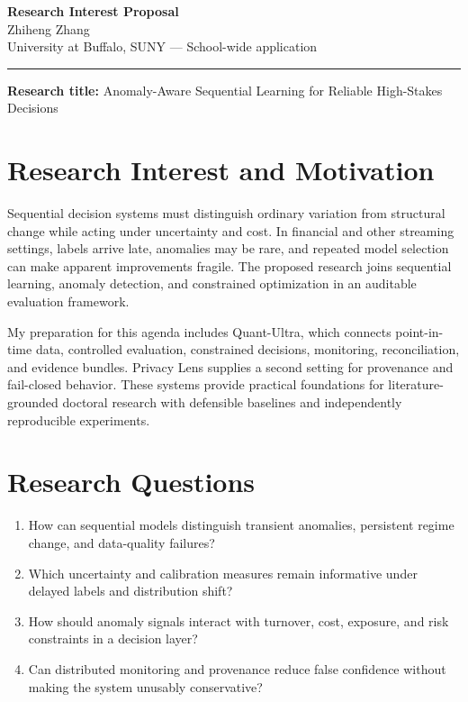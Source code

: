 \documentclass[11pt]{article}
\newcommand{\ApplicantName}{Zhiheng Zhang}
\begin{document}
\begin{center}
{\LARGE\bfseries Research Interest Proposal}\\[0.25em]
{\large \ApplicantName}\\
University at Buffalo, SUNY --- School-wide application
\end{center}
\vspace{0.35em}\hrule\vspace{0.65em}

\setlength{\parskip}{0.45em}
\textbf{Research title:} Anomaly-Aware Sequential Learning for Reliable High-Stakes Decisions

\section*{Research Interest and Motivation}
Sequential decision systems must distinguish ordinary variation from structural change while acting under uncertainty and cost. In financial and other streaming settings, labels arrive late, anomalies may be rare, and repeated model selection can make apparent improvements fragile. The proposed research joins sequential learning, anomaly detection, and constrained optimization in an auditable evaluation framework.

My preparation for this agenda includes Quant-Ultra, which connects point-in-time data, controlled evaluation, constrained decisions, monitoring, reconciliation, and evidence bundles. Privacy Lens supplies a second setting for provenance and fail-closed behavior. These systems provide practical foundations for literature-grounded doctoral research with defensible baselines and independently reproducible experiments.

\section*{Research Questions}
\begin{enumerate}
\item How can sequential models distinguish transient anomalies, persistent regime change, and data-quality failures?
\item Which uncertainty and calibration measures remain informative under delayed labels and distribution shift?
\item How should anomaly signals interact with turnover, cost, exposure, and risk constraints in a decision layer?
\item Can distributed monitoring and provenance reduce false confidence without making the system unusably conservative?
\end{enumerate}
\end{document}
